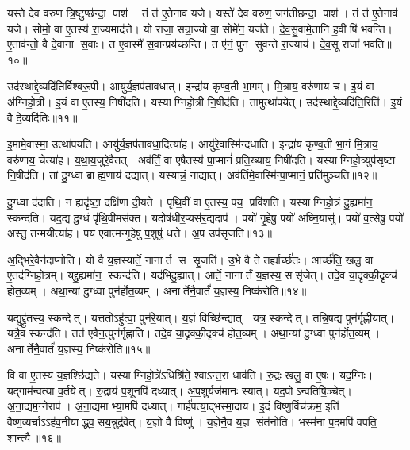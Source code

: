 यस्ते॑ देव वरुण त्रि॒ष्टुप्छ॑न्दा॒ पाश॑। तं त॑ ए॒तेनाव॑ यजे। यस्ते॑ देव वरुण॒ जग॑तीछन्दा॒ पाश॑। तं त॑ ए॒तेनाव॑ यजे। सोमो॒ वा ए॒तस्य॑ रा॒ज्यमाद॑त्ते। यो राजा॒ सन्रा॒ज्यो वा॒ सोमे॑न॒ यज॑ते। दे॒व॒सु॒वामे॒तानि॑ ह॒वीषि॑ भवन्ति। ए॒ताव॑न्तो॒ वै दे॒वाना स॒वाः। त ए॒वास्मै॑ स॒वान्प्रय॑च्छन्ति। त ए॑नं॒ पुन॑ सुवन्ते रा॒ज्याय॑। दे॒व॒सू राजा॑ भवति॥१०॥\anuvakamend[सोम॑ आवि॒शन् य॑जे रा॒ज्यायैकं॑ च]

उद॑स्थाद्दे॒व्यदि॑तिर्विश्वरू॒पी। आयु॑र्य॒ज्ञप॑तावधात्। इन्द्रा॑य कृण्व॒ती भा॒गम्। मि॒त्राय॒ वरु॑णाय च। इ॒यं वा अ॑ग्निहो॒त्री। इ॒यं वा ए॒तस्य॒ निषी॑दति। यस्याग्निहो॒त्री नि॒षीद॑ति। तामुत्था॑पयेत्। उद॑स्थाद्दे॒व्यदि॑ति॒रिति॑। इ॒यं वै दे॒व्यदि॑तिः॥११॥

इ॒मामे॒वास्मा॒ उत्था॑पयति। आयु॑र्य॒ज्ञप॑तावधा॒दित्या॑ह। आयु॑रे॒वास्मि॑न्दधाति। इन्द्रा॑य कृण्व॒ती भा॒गं मि॒त्राय॒ वरु॑णाय॒ चेत्या॑ह। य॒था॒य॒जुरे॒वैतत्। अव॑र्तिं॒ वा ए॒षैतस्य॑ पा॒प्मानं॑ प्रति॒ख्याय॒ निषी॑दति। यस्याग्निहो॒त्र्युप॑सृष्टा नि॒षीद॑ति। तां दु॒ग्ध्वा ब्राह्म॒णाय॑ दद्यात्। यस्यान्नं॒ नाद्यात्। अव॑र्तिमे॒वास्मि॑न्पा॒प्मानं॒ प्रति॑मुञ्चति॥१२॥

दु॒ग्ध्वा द॑दाति। न ह्यदृ॑ष्टा॒ दक्षि॑णा दी॒यते। पृ॒थि॒वीं वा ए॒तस्य॒ पय॒ प्रवि॑शति। यस्याग्निहो॒त्रं दु॒ह्यमा॑न॒ स्कन्द॑ति। यद॒द्य दु॒ग्धं पृ॑थि॒वीमस॑क्त। यदोष॑धीर॒प्यस॑र॒द्यदाप॑। पयो॑ गृ॒हेषु॒ पयो॑ अघ्नि॒यासु॑। पयो॑ व॒त्सेषु॒ पयो॑ अस्तु॒ तन्मयीत्या॑ह। पय॑ ए॒वात्मन्गृ॒हेषु॑ प॒शुषु॑ धत्ते। अ॒प उप॑सृजति॥१३॥

अ॒द्भिरे॒वैन॑दाप्नोति। यो वै य॒ज्ञस्यार्ते॒ नानार्त स सृ॒जति॑। उ॒भे वै ते तर्ह्यार्च्छ॑तः। आर्च्छ॑ति॒ खलु॒ वा ए॒तद॑ग्निहो॒त्रम्। यद्दु॒ह्यमा॑न॒ स्कन्द॑ति। यद॑भिदु॒ह्यात्। आर्ते॒ नानार्तं य॒ज्ञस्य॒ ससृ॑जेत्। तदे॒व या॒दृक्की॒दृक्च॑ होत॒व्यम्। अथा॒न्यां दु॒ग्ध्वा पुन॑र्\mbox{}होत॒व्यम्। अनार्तेनै॒वार्तं॑ य॒ज्ञस्य॒ निष्क॑रोति॥१४॥

यद्युद्द्रु॑तस्य॒ स्कन्देत्। यत्ततोऽहु॑त्वा॒ पुन॑रे॒यात्। य॒ज्ञं विच्छि॑न्द्यात्। यत्र॒ स्कन्देत्। तन्नि॒षद्य॒ पुन॑र्गृह्णीयात्। यत्रै॒व स्कन्द॑ति। तत॑ ए॒वैन॒त्पुन॑र्गृह्णाति। तदे॒व या॒दृक्की॒दृक्च॑ होत॒व्यम्। अथा॒न्यां दु॒ग्ध्वा पुन॑र्\mbox{}होत॒व्यम्। अनार्तेनै॒वार्तं॑ य॒ज्ञस्य॒ निष्क॑रोति॥१५॥

वि वा ए॒तस्य॑ य॒ज्ञश्छि॑द्यते। यस्याग्निहो॒त्रे॑ऽधिश्रि॑ते॒ श्वाऽन्त॒रा धाव॑ति। रु॒द्रः खलु॒ वा ए॒षः। यद॒ग्निः। यद्गाम॑न्वत्या व॒र्तयेत्। रु॒द्राय॑ प॒शूनपि॑ दध्यात्। अ॒प॒शुर्यज॑मानः स्यात्। यद॒पोऽन्वतिषि॒ञ्चेत्। अ॒ना॒द्यम॒ग्नेराप॑। अ॒ना॒द्यमाभ्या॒मपि॑ दध्यात्। गार्\mbox{}ह॑पत्या॒द्भस्मा॒दाय॑। इ॒दं विष्णु॒र्विच॑क्रम॒ इति॑ वैष्ण॒व्यर्चाऽऽह॑व॒नीयाद्ध्व॒सय॒न्नुद्र॑वेत्। य॒ज्ञो वै विष्णु॑। य॒ज्ञेनै॒व य॒ज्ञ संत॑नोति। भस्म॑ना प॒दमपि॑ वपति॒ शान्त्यै॥१६॥\anuvakamend[वै दे॒व्यदि॑तिर्मुञ्चति सृजति करोति करोत्याभ्या॒मपि॑ दध्या॒त् पञ्च॑ च]


